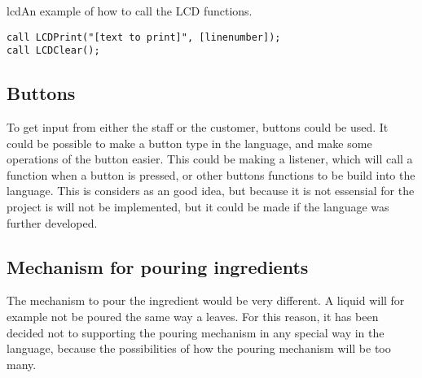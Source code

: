 \begin{code}{lcd}{An example of how to call the LCD functions.}
\begin{lstlisting}[mathescape]
call LCDPrint("[text to print]", [linenumber]);
call LCDClear();
\end{lstlisting}
\end{code}

\subsection{Buttons}
To get input from either the staff or the customer, buttons could be used. It could be possible to make a button type in the language, and make some operations of the button easier. This could be making a listener, which will call a function when a button is pressed, or other buttons functions to be build into the language. This is considers as an good idea, but because it is not essensial for the project is will not be implemented, but it could be made if the language was further developed.

\subsection{Mechanism for pouring ingredients}
The mechanism to pour the ingredient would be very different. A liquid will for example not be poured the same way a leaves. For this reason, it has been decided not to supporting the pouring mechanism in any special way in the language, because the possibilities of how the pouring mechanism will be too many.

